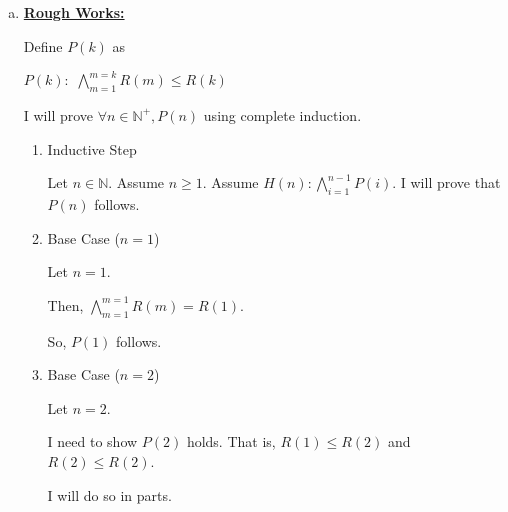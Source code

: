 \documentclass[12pt]{article}
\begin{document}
\begin{enumerate}[a.]
    \item

    \bigskip

    \begin{mdframed}

    \underline{\textbf{Rough Works:}}

    \bigskip

    Define $P(k)$ as

    \begin{center}
        $P(k):$ $\bigwedge\limits_{m=1}^{m=k} R(m) \leq R(k)$
    \end{center}

    \bigskip

    I will prove $\forall n \in \mathbb{N}^+, P(n)$ using complete induction.

    \bigskip

    \begin{enumerate}[1.]
        \item Inductive Step

        \begin{mdframed}
        Let $n \in \mathbb{N}$. Assume $n \geq 1$. Assume $H(n):\bigwedge\limits_{i=1}^{n-1} P(i)$.
        I will prove that $P(n)$ follows.

        \end{mdframed}

        \item Base Case ($n = 1$)

        \begin{mdframed}
        Let $n = 1$.

        \bigskip

        Then, $\bigwedge\limits_{m=1}^{m=1} R(m) = R(1)$.

        \bigskip

        So, $P(1)$ follows.

        \end{mdframed}

        \item Base Case ($n = 2$)

        \begin{mdframed}
        Let $n = 2$.

        \bigskip

        I need to show $P(2)$ holds. That is, $R(1) \leq R(2)$ and $R(2) \leq R(2)$.

        \bigskip

        I will do so in parts.


\end{mdframed}
\end{enumerate}
\end{mdframed}
\end{enumerate}
\end{document}
